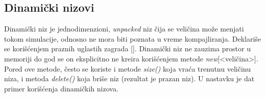 \begin{center}
\end{center}


\subsection{Dinamički nizovi}

Dinamički niz je jednodimenzioni, \emph{unpacked} niz čija se veličina može
menjati tokom simulacije, odnosno ne mora biti poznata u vreme kompajliranja.
Deklariše se korišćenjem praznih uglastih zagrada [].
Dinamički niz ne zauzima prostor u memoriji do god se on eksplicitno ne kreira
korišćenjem metode \emph{new}[\textless veličina\textgreater].
Pored ove metode, često se koriste i metode \emph{size()} koja vraća trenutnu
veličinu niza, i metoda \emph{delete()} koja briše niz (rezultat je prazan niz).
U nastavku je dat primer korišćenja dinamičkih nizova.



